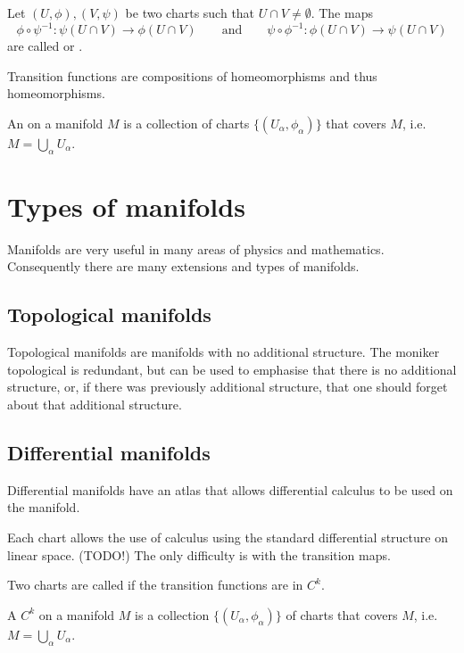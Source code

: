 \begin{definition}
Let $(U,\phi), (V,\psi)$ be two charts such that $U\cap V \neq \emptyset$. The maps
\[ \phi\circ\psi^{-1}:\psi(U\cap V)\to \phi(U\cap V) \qquad \text{and} \qquad \psi\circ\phi^{-1}:\phi(U\cap V)\to \psi(U\cap V) \]
are called  or .
\end{definition}
Transition functions are compositions of homeomorphisms and thus homeomorphisms.

\begin{definition}
An  on a manifold $M$ is a collection of charts $\{(U_\alpha, \phi_\alpha)\}$ that covers $M$, i.e.\ $M=\bigcup_\alpha U_\alpha$.
\end{definition}

\section{Types of manifolds}
Manifolds are very useful in many areas of physics and mathematics. Consequently there are many extensions and types of manifolds.
\subsection{Topological manifolds}
Topological manifolds are manifolds with no additional structure. The moniker topological is redundant, but can be used to emphasise that there is no additional structure, or, if there was previously additional structure, that one should forget about that additional structure.
\subsection{Differential manifolds} 
Differential manifolds have an atlas that allows differential calculus to be used on the manifold.

Each chart allows the use of calculus using the standard differential structure on linear space. (TODO!) The only difficulty is with the transition maps.
\begin{definition}
Two charts are called  if the transition functions are in $C^k$.
\end{definition}

\begin{definition}
A $C^k$  on a manifold $M$ is a collection  $\{(U_\alpha, \phi_\alpha)\}$ of  charts that covers $M$, i.e.\ $M=\bigcup_\alpha U_\alpha$.
\end{definition}


